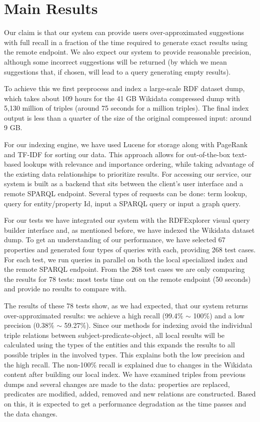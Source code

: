 \section{Main Results}

Our claim is that our system can provide users over-approximated suggestions with full recall in a fraction of the time required to
generate exact results using the remote endpoint. We also expect our system to provide reasonable precision, although some incorrect suggestions will be returned (by which we mean suggestions that, if chosen, will lead to a query generating empty results).

To achieve this we first preprocess and index a large-scale RDF dataset dump, which takes about 109 hours for the 41 GB Wikidata compressed dump with 5,130 million of triples (around 75 seconds for a million triples). The final index output is less than a quarter of the size of the original compressed input: around 9 GB. 

For our indexing engine, we have used Lucene for storage along with PageRank and TF-IDF for sorting our data. This approach allows for out-of-the-box text-based lookups with relevance and importance ordering, while taking advantage of the existing data relationships to prioritize results. For accessing our service, our system is built as a backend that sits between the client's user interface and a remote SPARQL endpoint. Several types of requests can be done: term lookup, query for entity/property Id, input a SPARQL query or input a graph query.

For our tests we have integrated our system with the RDFExplorer visual query builder interface and, as mentioned before, we have indexed the Wikidata dataset dump. To get an understanding of our performance, we have selected 67 properties and generated four types of queries with each, providing 268 test cases. For each test, we run queries in parallel on both the local specialized index and the remote SPARQL endpoint. From the 268 test cases we are only comparing the results for 78 tests: most tests time out on the remote endpoint (50 seconds) and provide no results to compare with. 

The results of these 78 tests show, as we had expected, that our system returns over-approximated results: we achieve a high recall (99.4\% $\sim$ 100\%) and a low precision (0.38\% $\sim$ 59.27\%). Since our methods for indexing avoid the individual triple relations between subject-predicate-object, all local results will be calculated using the types of the entities and this expands the results to all possible triples in the involved types. This explains both the low precision and the high recall. The non-100\% recall is explained due to changes in the Wikidata content after building our local index. We have examined triples from previous dumps and several changes are made to the data: properties are replaced, predicates are modified, added, removed and new relations are constructed. Based on this, it is expected to get a performance degradation as the time passes and the data changes.

